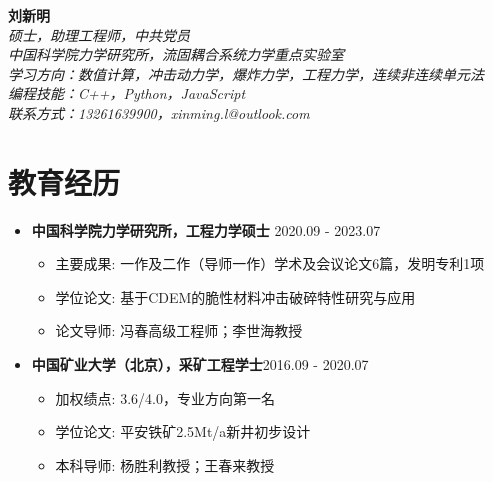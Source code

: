 \documentclass[a4paper,12pt]{extarticle}
\begin{document}
\pagestyle{empty}

\begin{flushleft}
    \textbf{\Large 刘新明}\\[2pt] %
    \textit{硕士，助理工程师，中共党员\\
    中国科学院力学研究所，流固耦合系统力学重点实验室\\
    学习方向：数值计算，冲击动力学，爆炸力学，工程力学，连续非连续单元法\\编程技能：C++，Python，JavaScript\\
    联系方式：13261639900，xinming.l@outlook.com
    }
\end{flushleft}

\section*{教育经历}
\begin{itemize}
    \item \textbf{中国科学院力学研究所，工程力学硕士} \hfill 2020.09 - 2023.07
     \begin{itemize}
    \item 主要成果: 一作及二作（导师一作）学术及会议论文6篇，发明专利1项
    \item 学位论文: 基于CDEM的脆性材料冲击破碎特性研究与应用
    \item 论文导师: 冯春高级工程师；李世海教授
   
\end{itemize}
\end{itemize}

\begin{itemize}
    \item \textbf{中国矿业大学（北京），采矿工程学士}\hfill \hfill 2016.09 - 2020.07
     \begin{itemize}
    \item 加权绩点: 3.6/4.0，专业方向第一名
    \item 学位论文: 平安铁矿2.5Mt/a新井初步设计 
    \item 本科导师: 杨胜利教授；王春来教授
    \end{itemize}
\end{itemize}
\end{document}
